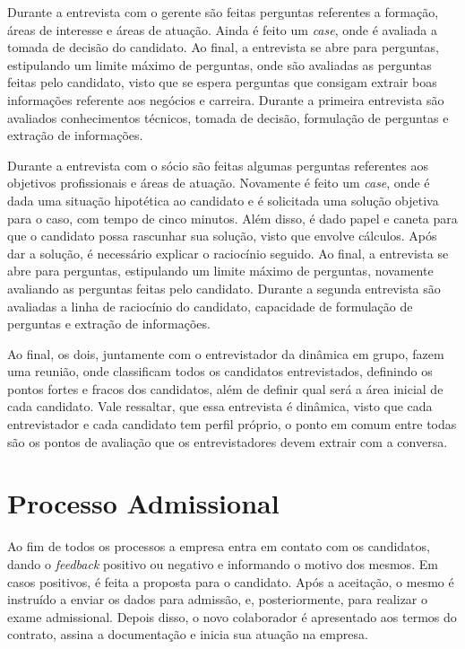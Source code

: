 Durante a entrevista com o gerente são feitas perguntas referentes a formação, áreas de interesse e áreas de atuação. Ainda é feito um \textit{case}, onde é avaliada a tomada de decisão do candidato.
Ao final, a entrevista se abre para perguntas, estipulando um limite máximo de perguntas, onde são avaliadas as perguntas feitas pelo candidato, visto que se espera perguntas que consigam extrair boas informações referente aos negócios e carreira.
Durante a primeira entrevista são avaliados conhecimentos técnicos, tomada de decisão, formulação de perguntas e extração de informações.
    
Durante a entrevista com o sócio são feitas algumas perguntas referentes aos objetivos profissionais e áreas de atuação. Novamente é feito um \textit{case}, onde é dada uma situação hipotética ao candidato e é solicitada uma solução objetiva para o caso, com tempo de cinco minutos. Além disso, é dado papel e caneta para que o candidato possa rascunhar sua solução, visto que envolve cálculos. Após dar a solução, é necessário explicar o raciocínio seguido.
Ao final, a entrevista se abre para perguntas, estipulando um limite máximo de perguntas, novamente avaliando as perguntas feitas pelo candidato.
Durante a segunda entrevista são avaliadas a linha de raciocínio do candidato, capacidade de formulação de perguntas e extração de informações.

Ao final, os dois, juntamente com o entrevistador da dinâmica em grupo, fazem uma reunião, onde classificam todos os candidatos entrevistados, definindo os pontos fortes e fracos dos candidatos, além de definir qual será a área inicial de cada candidato.
Vale ressaltar, que essa entrevista é dinâmica, visto que cada entrevistador e cada candidato tem perfil próprio, o ponto em comum entre todas são os pontos de avaliação que os entrevistadores devem extrair com a conversa.


\section{Processo Admissional}
Ao fim de todos os processos a empresa entra em contato com os candidatos, dando o \textit{feedback} positivo ou negativo e informando o motivo dos mesmos. Em casos positivos, é feita a proposta para o candidato. Após a aceitação, o mesmo é instruído a enviar os dados para admissão, e, posteriormente, para realizar o exame admissional. Depois disso, o novo colaborador é apresentado aos termos do contrato, assina a documentação e inicia sua atuação na empresa.